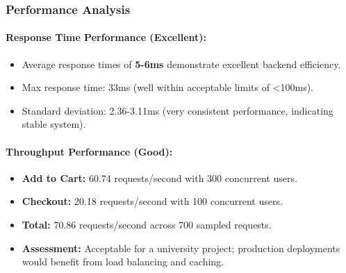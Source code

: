 \documentclass[11pt,a4paper]{article}
\begin{document}
\subsubsection{Performance Analysis}

\paragraph{Response Time Performance (Excellent):}
\begin{itemize}
    \item Average response times of \textbf{5-6ms} demonstrate excellent backend efficiency.
    \item Max response time: 33ms (well within acceptable limits of <100ms).
    \item Standard deviation: 2.36-3.11ms (very consistent performance, indicating stable system).
\end{itemize}

\paragraph{Throughput Performance (Good):}
\begin{itemize}
    \item \textbf{Add to Cart:} 60.74 requests/second with 300 concurrent users.
    \item \textbf{Checkout:} 20.18 requests/second with 100 concurrent users.
    \item \textbf{Total:} 70.86 requests/second across 700 sampled requests.
    \item \textbf{Assessment:} Acceptable for a university project; production deployments would benefit from load balancing and caching.
\end{itemize}
\end{document}
